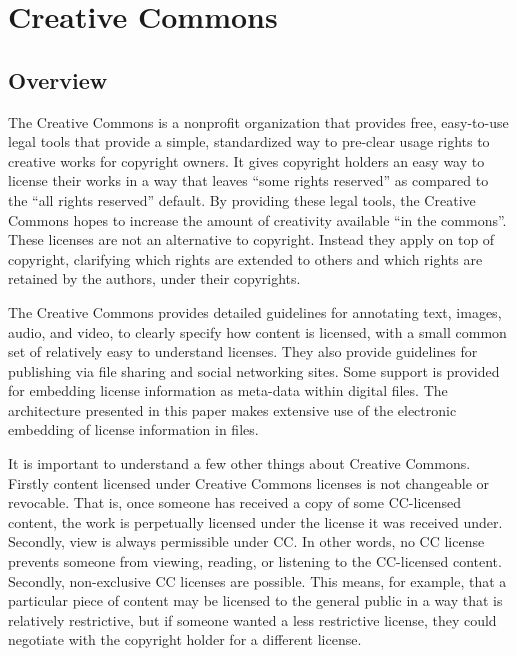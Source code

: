 \documentclass[botnum,fleqn,final]{unmeethesis}
\begin{document}
\section{\label{section:intro:cc}Creative Commons}

\subsection{Overview}\label{section:intro:cc:overview}

The Creative Commons is a nonprofit organization that provides free,
easy-to-use legal tools that provide a simple, standardized way to pre-clear
usage rights to creative works for copyright owners.  It gives copyright
holders an easy way to license their works in a way that leaves ``some rights
reserved'' as compared to the ``all rights reserved'' default.  By providing
these legal tools, the Creative Commons hopes to increase the amount of
creativity available ``in the commons''.  These licenses are not an alternative
to copyright.  Instead they apply on top of copyright, clarifying which rights
are extended to others and which rights are retained by the authors, under
their copyrights.

The Creative Commons provides detailed guidelines for annotating text, images,
audio, and video, to clearly specify how content is licensed, with a small
common set of relatively easy to understand licenses.  They also provide
guidelines for publishing via file sharing and social networking sites.  Some
support is provided for embedding license information as meta-data within
digital files.  The architecture presented in this paper makes extensive use of
the electronic embedding of license information in files.

It is important to understand a few other things about Creative Commons.
Firstly content licensed under Creative Commons licenses is not changeable or
revocable.  That is, once someone has received a copy of some CC-licensed
content, the work is perpetually licensed under the license it was received
under.  Secondly, view is always permissible under CC.  In other words, no CC
license prevents someone from viewing, reading, or listening to the CC-licensed
content.  Secondly, non-exclusive CC licenses are possible.  This means, for
example, that a particular piece of content may be licensed to the general
public in a way that is relatively restrictive, but if someone wanted a less
restrictive license, they could negotiate with the copyright holder for a
different license.
\end{document}
